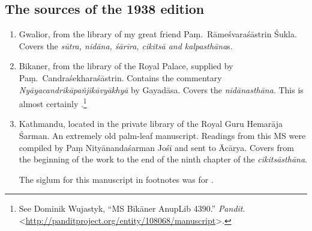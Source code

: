\subsection{The sources of the 1938 edition}
\begin{enumerate}
    \item [1]  Gwalior, from the library of my great friend Paṃ.\ Rāmeśvaraśāstrin 
    Śukla. 
    Covers the \emph{sūtra, nidāna, śārīra, cikitsā and kalpasthāna}s.
    
    \item[2] Bikaner, from the library of the Royal Palace, supplied by Paṃ.\ 
    Candraśekharaśāstrin. Contains the commentary 
    \emph{Nyāyacandrikāpañjikāvyākhyā} by Gayadāsa.  Covers the 
    \emph{nidānasthāna}.      
    This is almost certainly .\footnote{See Dominik Wujastyk, “MS Bīkāner AnupLib 4390.” 
    \emph{Pandit}. 
    <\url{http://panditproject.org/entity/108068/manuscript}>.}
    
    \item [3] Kathmandu, located in the private library of the Royal Guru Hemarāja 
    Śarman.  An extremely old palm-leaf manuscript. Readings from this MS were 
    compiled by Paṃ Nityānandaśarman Jośī and sent to Ācārya. Covers from the 
    beginning of the work to the end of the ninth chapter of the 
    \emph{cikitsāsthāna}.  
    
    The siglum for this manuscript in footnotes was  for 
    \dev{tālapatrapustake}. 
\end{enumerate}
